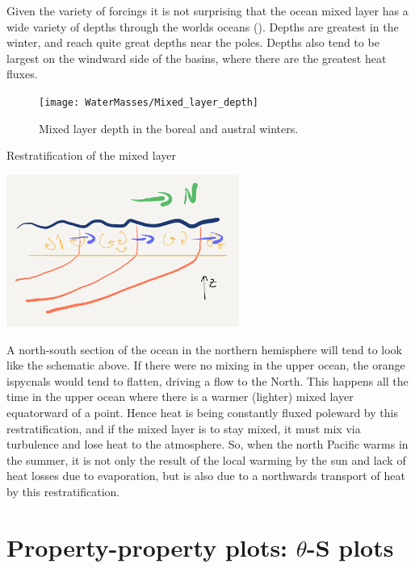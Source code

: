 Given the variety of forcings it is not surprising that the ocean mixed layer has a wide variety of depths through the worlds oceans ().  Depths are greatest in the winter, and reach quite great depths near the poles.  Depths also tend to be largest on the windward side of the basins, where there are the greatest heat fluxes.  

\begin{figure}[htp]
  \centering
  \texttt{[image: WaterMasses/Mixed\_layer\_depth]}
    \caption{Mixed layer depth in the boreal and austral winters.}
    \label{fig:Mixed_layer_depth}  
\end{figure}


\begin{derivbox}[label={box:Restratification}]{Restratification of the mixed layer}
  \begin{center}
    \includegraphics[width=3in]{figs/WaterMasses/SchemRestratfication}
  \end{center}
  A north-south section of the ocean in the northern hemisphere will tend to look like the schematic above.  If there were no mixing in the upper ocean, the orange ispycnals would tend to flatten, driving a flow to the North.  This happens all the time in the upper ocean where there is a warmer (lighter) mixed layer equatorward of a point.  Hence heat is being constantly fluxed poleward by this restratification, and if the mixed layer is to stay mixed, it must mix via turbulence and lose heat to the atmosphere.  So, when the north Pacific warms in the summer, it is not only the result of the local warming by the sun and lack of heat losses due to evaporation, but is also due to a northwards transport of heat by this restratification.  
\end{derivbox}

\section{Property-property plots: $\theta$-S plots}


